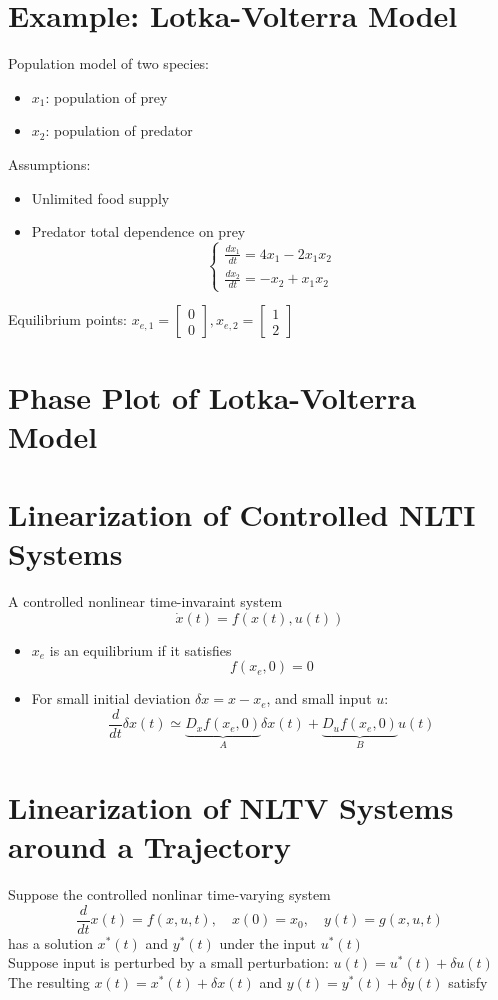 \documentclass[10pt,a4paper,oneside]{article}
\begin{document}
\section{Example: Lotka-Volterra Model}
Population model of two species:
\begin{itemize}
\item $x_1$: population of prey
\item $x_2$: population of predator
\end{itemize}
Assumptions:
\begin{itemize}
\item Unlimited food supply
\item Predator total dependence on prey
\[
\left\{\begin{array}{l}{\frac{d x_{1}}{d t}=4 x_{1}-2 x_{1} x_{2}} \\ {\frac{d x_{2}}{d t}=-x_{2}+x_{1} x_{2}}\end{array}\right.
\]
\end{itemize}
Equilibrium points: $x_{e, 1}=\left[\begin{array}{l}{0} \\ {0}\end{array}\right], x_{e, 2}=\left[\begin{array}{l}{1} \\ {2}\end{array}\right]$
\section{Phase Plot of Lotka-Volterra Model}
\section{Linearization of Controlled NLTI Systems}
A controlled nonlinear time-invaraint system
\[
\dot{x}(t)=f(x(t), u(t))
\]
\begin{itemize}
\item $x_e$ is an equilibrium if it satisfies
\[
f(x_e,0)=0
\]
\item For small initial deviation $\delta x=x-x_e$, and small input $u$:
\[
\frac{d}{d t} \delta x(t) \simeq \underbrace{D_{x} f\left(x_{e}, 0\right)}_{A} \delta x(t)+\underbrace{D_{u} f\left(x_{e}, 0\right)}_{B} u(t)
\]
\end{itemize}
\section{Linearization of NLTV Systems around a Trajectory}
Suppose the controlled nonlinar time-varying system
\[
\frac{d}{d t} x(t)=f(x, u, t), \quad x(0)=x_{0}, \quad y(t)=g(x, u, t)
\]
has a solution $x^{*}(t)$ and $y^{*}(t)$ under the input $u^{*}(t)$\\
Suppose input is perturbed by a small perturbation: $u(t)=u^{*}(t)+\delta u(t)$\\
The resulting $x(t)=x^{*}(t)+\delta x(t)$ and $y(t)=y^{*}(t)+\delta y(t)$ satisfy
\end{document}
